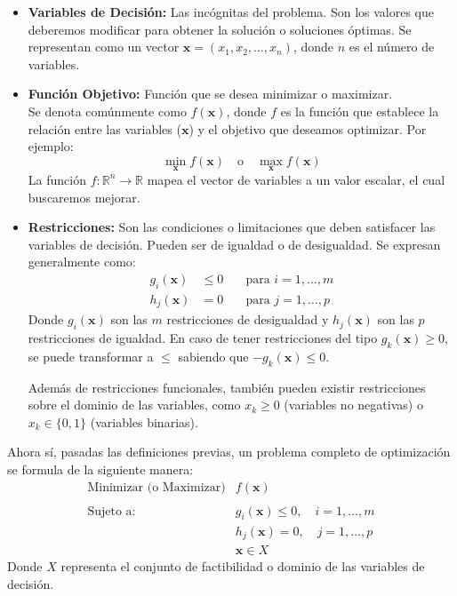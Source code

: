 \documentclass[12pt,a4paper]{book}
\begin{document}
\begin{itemize}
    \item \textbf{Variables de Decisión:} Las incógnitas del problema. Son los valores que deberemos modificar para obtener la solución o soluciones óptimas. Se representan como un vector $\mathbf{x} = (x_1, x_2, \ldots, x_n)$, donde $n$ es el número de variables.

    \item \textbf{Función Objetivo:} Función que se desea minimizar o maximizar.\\
    Se denota comúnmente como $f(\mathbf{x})$, donde $f$ es la función que establece la relación entre las variables ($\mathbf{x}$) y el objetivo que deseamos optimizar.
    Por ejemplo:
    $$ \min_{\mathbf{x}} f(\mathbf{x}) \quad \text{o} \quad \max_{\mathbf{x}} f(\mathbf{x}) $$
    La función $f: \mathbb{R}^n \to \mathbb{R}$ mapea el vector de variables a un valor escalar, el cual buscaremos mejorar.

    \item \textbf{Restricciones:} Son las condiciones o limitaciones que deben satisfacer las variables de decisión. Pueden ser de igualdad o de desigualdad. Se expresan generalmente como:
    \begin{align*}
        g_i(\mathbf{x}) &\le 0 & \quad \text{para } i = 1, \ldots, m \\
        h_j(\mathbf{x}) &= 0 & \quad \text{para } j = 1, \ldots, p
    \end{align*}
    Donde $g_i(\mathbf{x})$ son las $m$ restricciones de desigualdad y $h_j(\mathbf{x})$ son las $p$ restricciones de igualdad.
    En caso de tener restricciones del tipo $g_k(\mathbf{x})\geq0$, se puede transformar a $\leq$ sabiendo que $-g_k(\mathbf{x}) \leq 0$.
    
    Además de restricciones funcionales, también pueden existir restricciones sobre el dominio de las variables, como $x_k \ge 0$ (variables no negativas) o $x_k \in \{0,1\}$ (variables binarias).
\end{itemize}

Ahora sí, pasadas las definiciones previas, un problema completo de optimización se formula de la siguiente manera:
$$
\begin{array}{ll}
\text{Minimizar (o Maximizar)} & f(\mathbf{x}) \\ \\
\text{Sujeto a:} & g_i(\mathbf{x}) \le 0, \quad i = 1, \ldots, m \\
& h_j(\mathbf{x}) = 0, \quad j = 1, \ldots, p \\
& \mathbf{x} \in X
\end{array}
$$
Donde $X$ representa el conjunto de factibilidad o dominio de las variables de decisión.
\end{document}
